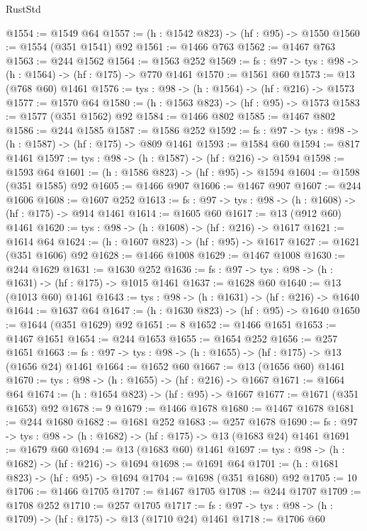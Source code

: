 \begin{lexlean}{RustStd}
\begin{coremodule}
@1554 := @1549 @64
@1557 := (h : @1542 @823) -> (hf : @95) -> @1550
@1560 := @1554 (@351 @1541) @92
@1561 := @1466 @763
@1562 := @1467 @763
@1563 := @244 @1562
@1564 := @1563 @252
@1569 := {fs : @97} -> {tys : @98} -> (h : @1564) -> (hf : @175) -> @770 @1461
@1570 := @1561 @60
@1573 := @13 (@768 @60) @1461
@1576 := {tys : @98} -> (h : @1564) -> (hf : @216) -> @1573
@1577 := @1570 @64
@1580 := (h : @1563 @823) -> (hf : @95) -> @1573
@1583 := @1577 (@351 @1562) @92
@1584 := @1466 @802
@1585 := @1467 @802
@1586 := @244 @1585
@1587 := @1586 @252
@1592 := {fs : @97} -> {tys : @98} -> (h : @1587) -> (hf : @175) -> @809 @1461
@1593 := @1584 @60
@1594 := @817 @1461
@1597 := {tys : @98} -> (h : @1587) -> (hf : @216) -> @1594
@1598 := @1593 @64
@1601 := (h : @1586 @823) -> (hf : @95) -> @1594
@1604 := @1598 (@351 @1585) @92
@1605 := @1466 @907
@1606 := @1467 @907
@1607 := @244 @1606
@1608 := @1607 @252
@1613 := {fs : @97} -> {tys : @98} -> (h : @1608) -> (hf : @175) -> @914 @1461
@1614 := @1605 @60
@1617 := @13 (@912 @60) @1461
@1620 := {tys : @98} -> (h : @1608) -> (hf : @216) -> @1617
@1621 := @1614 @64
@1624 := (h : @1607 @823) -> (hf : @95) -> @1617
@1627 := @1621 (@351 @1606) @92
@1628 := @1466 @1008
@1629 := @1467 @1008
@1630 := @244 @1629
@1631 := @1630 @252
@1636 := {fs : @97} -> {tys : @98} -> (h : @1631) -> (hf : @175) -> @1015 @1461
@1637 := @1628 @60
@1640 := @13 (@1013 @60) @1461
@1643 := {tys : @98} -> (h : @1631) -> (hf : @216) -> @1640
@1644 := @1637 @64
@1647 := (h : @1630 @823) -> (hf : @95) -> @1640
@1650 := @1644 (@351 @1629) @92
@1651 := 8
@1652 := @1466 @1651
@1653 := @1467 @1651
@1654 := @244 @1653
@1655 := @1654 @252
@1656 := @257 @1651
@1663 := {fs : @97} -> {tys : @98} -> (h : @1655) -> (hf : @175) -> @13 (@1656 @24) @1461
@1664 := @1652 @60
@1667 := @13 (@1656 @60) @1461
@1670 := {tys : @98} -> (h : @1655) -> (hf : @216) -> @1667
@1671 := @1664 @64
@1674 := (h : @1654 @823) -> (hf : @95) -> @1667
@1677 := @1671 (@351 @1653) @92
@1678 := 9
@1679 := @1466 @1678
@1680 := @1467 @1678
@1681 := @244 @1680
@1682 := @1681 @252
@1683 := @257 @1678
@1690 := {fs : @97} -> {tys : @98} -> (h : @1682) -> (hf : @175) -> @13 (@1683 @24) @1461
@1691 := @1679 @60
@1694 := @13 (@1683 @60) @1461
@1697 := {tys : @98} -> (h : @1682) -> (hf : @216) -> @1694
@1698 := @1691 @64
@1701 := (h : @1681 @823) -> (hf : @95) -> @1694
@1704 := @1698 (@351 @1680) @92
@1705 := 10
@1706 := @1466 @1705
@1707 := @1467 @1705
@1708 := @244 @1707
@1709 := @1708 @252
@1710 := @257 @1705
@1717 := {fs : @97} -> {tys : @98} -> (h : @1709) -> (hf : @175) -> @13 (@1710 @24) @1461
@1718 := @1706 @60

\end{coremodule}
\end{lexlean}
